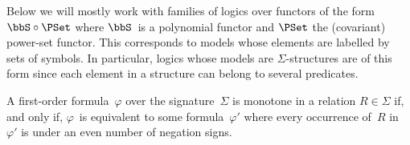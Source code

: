 \documentclass[10pt, fleqn]{scrartcl}
\DeclareRobustCommand*{\dom}{\qopname\relax o{dom}}
\newcommand*{\sh}{\mathrm{sh}}
\newcommand*{\?}{\kern .08em}
\newcommand\upqed{\vskip-\baselineskip\vskip-\belowdisplayskip}
\begin{document}
Below we will mostly work with families of logics over functors of the form
$\bbS \circ \PSet$ where $\bbS$~is a polynomial functor and $\PSet$ the (covariant)
power-set functor. This corresponds to models whose elements are labelled by sets of symbols.
In particular, logics whose models are $\Sigma$-structures are of this form since
each element in a structure can belong to several predicates.
\begin{Exam}
A first-order formula~$\varphi$ over the signature~$\Sigma$
is monotone in a relation $R \in \Sigma$ if, and only if,
$\varphi$~is equivalent to some formula~$\varphi'$ where
every occurrence of~$R$ in~$\varphi'$ is under an even number of negation signs.
\end{Exam}
\end{document}
